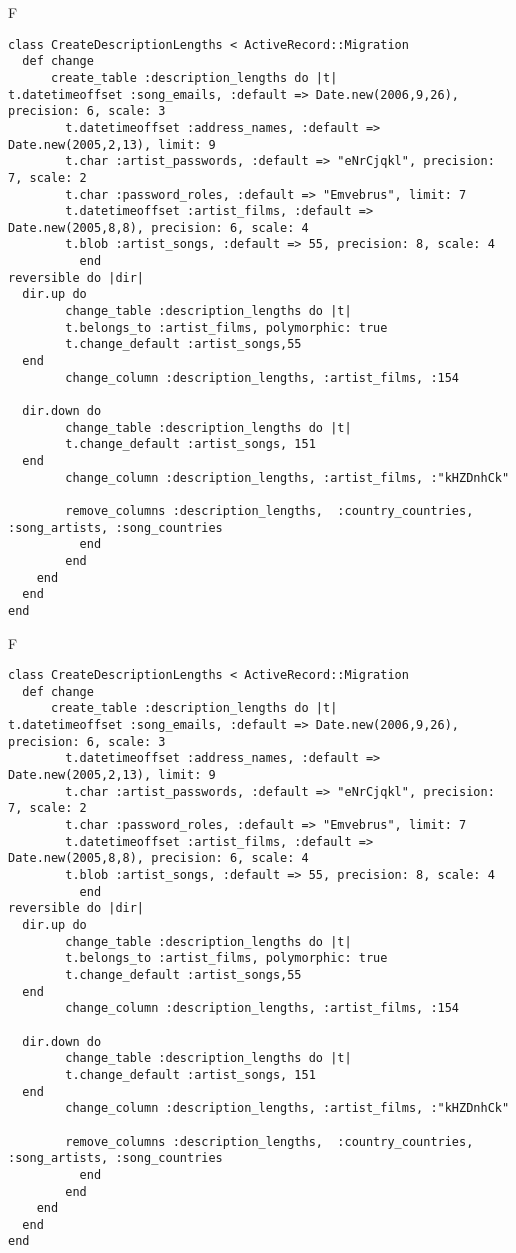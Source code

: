 F
\begin{verbatim}
class CreateDescriptionLengths < ActiveRecord::Migration
  def change
	  create_table :description_lengths do |t|
t.datetimeoffset :song_emails, :default => Date.new(2006,9,26), precision: 6, scale: 3
		t.datetimeoffset :address_names, :default => Date.new(2005,2,13), limit: 9
		t.char :artist_passwords, :default => "eNrCjqkl", precision: 7, scale: 2
		t.char :password_roles, :default => "Emvebrus", limit: 7
		t.datetimeoffset :artist_films, :default => Date.new(2005,8,8), precision: 6, scale: 4
		t.blob :artist_songs, :default => 55, precision: 8, scale: 4
		  end
reversible do |dir|
  dir.up do
		change_table :description_lengths do |t|
		t.belongs_to :artist_films, polymorphic: true
 		t.change_default :artist_songs,55
  end
 		change_column :description_lengths, :artist_films, :154
   
  dir.down do
		change_table :description_lengths do |t|
		t.change_default :artist_songs, 151
  end
 		change_column :description_lengths, :artist_films, :"kHZDnhCk"
   
		remove_columns :description_lengths,  :country_countries, :song_artists, :song_countries 
	      end
	    end
    end 
  end
end

\end{verbatim}

F
\begin{verbatim}
class CreateDescriptionLengths < ActiveRecord::Migration
  def change
	  create_table :description_lengths do |t|
t.datetimeoffset :song_emails, :default => Date.new(2006,9,26), precision: 6, scale: 3
		t.datetimeoffset :address_names, :default => Date.new(2005,2,13), limit: 9
		t.char :artist_passwords, :default => "eNrCjqkl", precision: 7, scale: 2
		t.char :password_roles, :default => "Emvebrus", limit: 7
		t.datetimeoffset :artist_films, :default => Date.new(2005,8,8), precision: 6, scale: 4
		t.blob :artist_songs, :default => 55, precision: 8, scale: 4
		  end
reversible do |dir|
  dir.up do
		change_table :description_lengths do |t|
		t.belongs_to :artist_films, polymorphic: true
 		t.change_default :artist_songs,55
  end
 		change_column :description_lengths, :artist_films, :154
   
  dir.down do
		change_table :description_lengths do |t|
		t.change_default :artist_songs, 151
  end
 		change_column :description_lengths, :artist_films, :"kHZDnhCk"
   
		remove_columns :description_lengths,  :country_countries, :song_artists, :song_countries 
	      end
	    end
    end 
  end
end

\end{verbatim}


